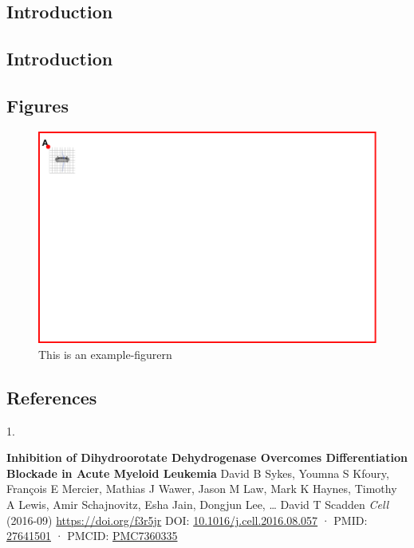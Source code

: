 \documentclass[
]{article}
\makeatletter
\newlength{\cslhangindent}
\newlength{\csllabelwidth}
\newlength{\cslentryspacingunit} %
\newenvironment{CSLReferences}[2] %
 {%
  \setlength{\parindent}{0pt}
  \ifodd #1
  \let\oldpar\par
  \def\par{\hangindent=\cslhangindent\oldpar}
  \fi
  \setlength{\parskip}{#2\cslentryspacingunit}
 }%
 {}
\newcommand{\CSLBlock}[1]{#1\hfill\break}
\newcommand{\CSLLeftMargin}[1]{\parbox[t]{\csllabelwidth}{#1}}
\newcommand{\CSLRightInline}[1]{\parbox[t]{\linewidth - \csllabelwidth}{#1}\break}
\newcounter{figno}
\newenvironment{fignos:no-prefix-figure-caption}{
  \caption@ifcompatibility{}{
    \let\oldthefigure\thefigure
    \let\oldtheHfigure\theHfigure
    \renewcommand{\thefigure}{figno:\thefigno}
    \renewcommand{\theHfigure}{figno:\thefigno}
    \stepcounter{figno}
    \captionsetup{labelformat=empty}
  }
}{
  \caption@ifcompatibility{}{
    \captionsetup{labelformat=default}
    \let\thefigure\oldthefigure
    \let\theHfigure\oldtheHfigure
    \addtocounter{figure}{-1}
  }
}
\makeatother
\begin{document}
\hypertarget{introduction-1}{%
\subsection{Introduction}\label{introduction-1}}

\hypertarget{introduction-2}{%
\subsection{Introduction}\label{introduction-2}}

\hypertarget{figures}{%
\subsection{Figures}\label{figures}}

\begin{fignos:no-prefix-figure-caption}

\begin{figure}
\centering
\includegraphics{figures/example-figure.pdf}
\caption{This is an example-figurern}
\end{figure}

\end{fignos:no-prefix-figure-caption}

\hypertarget{references}{%
\subsection{References}\label{references}}

\hypertarget{refs}{}
\begin{CSLReferences}{0}{0}
\leavevmode{}%
\CSLLeftMargin{1. }
\CSLRightInline{\textbf{Inhibition of Dihydroorotate Dehydrogenase Overcomes Differentiation Blockade in Acute Myeloid Leukemia}
\CSLBlock{David B Sykes, Youmna S Kfoury, François E Mercier, Mathias J Wawer, Jason M Law, Mark K Haynes, Timothy A Lewis, Amir Schajnovitz, Esha Jain, Dongjun Lee, \ldots{} David T Scadden} \emph{Cell} (2016-09) \url{https://doi.org/f3r5jr}
\CSLBlock{DOI: \href{https://doi.org/10.1016/j.cell.2016.08.057}{10.1016/j.cell.2016.08.057} · PMID: \href{https://www.ncbi.nlm.nih.gov/pubmed/27641501}{27641501} · PMCID: \href{https://www.ncbi.nlm.nih.gov/pmc/articles/PMC7360335}{PMC7360335}}}

\end{CSLReferences}
\end{document}
